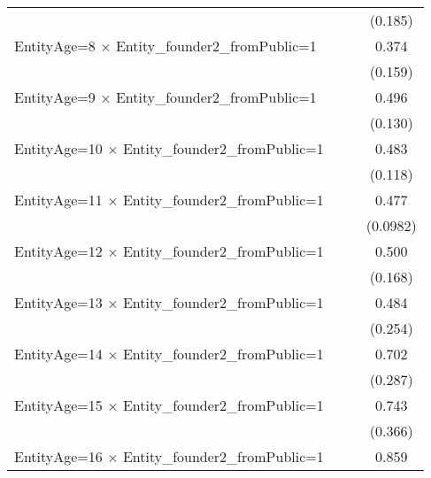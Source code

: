 {\begin{tabular}{l*{3}{c}}
                    &                     &                     &     (0.185)         \\
[1em]
EntityAge=8 $\times$ Entity\_founder2\_fromPublic=1&                     &                     &       0.374\sym{*}  \\
                    &                     &                     &     (0.159)         \\
[1em]
EntityAge=9 $\times$ Entity\_founder2\_fromPublic=1&                     &                     &       0.496\sym{***}\\
                    &                     &                     &     (0.130)         \\
[1em]
EntityAge=10 $\times$ Entity\_founder2\_fromPublic=1&                     &                     &       0.483\sym{***}\\
                    &                     &                     &     (0.118)         \\
[1em]
EntityAge=11 $\times$ Entity\_founder2\_fromPublic=1&                     &                     &       0.477\sym{***}\\
                    &                     &                     &    (0.0982)         \\
[1em]
EntityAge=12 $\times$ Entity\_founder2\_fromPublic=1&                     &                     &       0.500\sym{**} \\
                    &                     &                     &     (0.168)         \\
[1em]
EntityAge=13 $\times$ Entity\_founder2\_fromPublic=1&                     &                     &       0.484         \\
                    &                     &                     &     (0.254)         \\
[1em]
EntityAge=14 $\times$ Entity\_founder2\_fromPublic=1&                     &                     &       0.702\sym{*}  \\
                    &                     &                     &     (0.287)         \\
[1em]
EntityAge=15 $\times$ Entity\_founder2\_fromPublic=1&                     &                     &       0.743         \\
                    &                     &                     &     (0.366)         \\
[1em]
EntityAge=16 $\times$ Entity\_founder2\_fromPublic=1&                     &                     &       0.859\sym{*}  \\

\end{tabular}}
